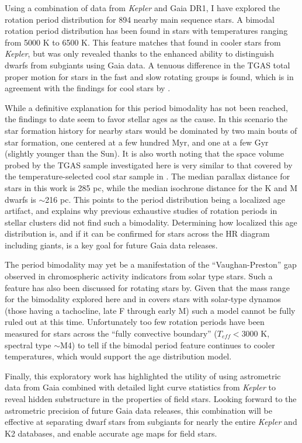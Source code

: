 \documentclass[manuscript, letterpaper]{aastex6}
\newcommand{\Kepler}{\textsl{Kepler}\xspace}
\begin{document}
Using a combination of data from \Kepler and Gaia DR1, I have explored the rotation period distribution for 894 nearby main sequence stars. A bimodal rotation period distribution has been found in stars with temperatures ranging from 5000 K to 6500 K. This feature matches that found in cooler stars from \Kepler, but was only revealed thanks to the enhanced ability to distinguish dwarfs from subgiants using Gaia data. 
A tenuous difference in the TGAS total proper motion for stars in the fast and slow rotating groups is found, which is in agreement with the findings for cool stars by \citet{mcquillan2013}.

While a definitive explanation for this period bimodality has not been reached, the findings to date seem to favor stellar ages as the cause. In this scenario the star formation history for nearby stars would be dominated by two main bouts of star formation, one centered at a few hundred Myr, and one at a few Gyr (slightly younger than the Sun). It is also worth noting that the space volume probed by the TGAS sample investigated here is very similar to that covered by the temperature-selected cool star sample in \citet{mcquillan2013}. The median parallax distance for stars in this work is 285 pc, while the median isochrone distance for the K and M dwarfs is $\sim$216 pc. This points to the period distribution being a localized age artifact, and explains why previous exhaustive studies of rotation periods in stellar clusters did not find such a bimodality. Determining how localized this age distribution is, and if it can be confirmed for stars across the HR diagram including giants, is a key goal for future Gaia data releases.


The period bimodality may yet be a manifestation of the ``Vaughan-Preston'' gap observed in chromospheric activity indicators from solar type stars. Such a feature has also been discussed for rotating stars by\citet{kado-fong2016}. Given that the mass range for the bimodality explored here and in \citet{mcquillan2014} covers stars with solar-type dynamos (those having a tachocline, late F through early M) such a model cannot be fully ruled out at this time. Unfortunately too few rotation periods have been measured for stars across the ``fully convective boundary'' ($T_{eff}<3000$ K, spectral type $\sim$M4) to tell if the bimodal period feature continues to cooler temperatures, which would support the age distribution model.


Finally, this exploratory work has highlighted the utility of using astrometric data from Gaia combined with detailed light curve statistics from \Kepler to reveal hidden substructure in the properties of field stars. Looking forward to the astrometric precision of future Gaia data releases, this combination will be effective at separating dwarf stars from subgiants for nearly the entire \Kepler and K2 databases, and enable accurate age maps for field stars.
\end{document}
